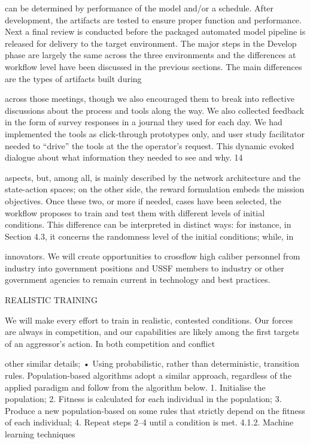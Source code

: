 \documentclass[a4paper,12pt]{article}
\begin{document}
can be determined by performance of the model and/or a schedule.
After development, the artifacts are tested to ensure proper function and performance. Next a ﬁnal review is conducted
before the packaged automated model pipeline is released for delivery to the target environment.
The major steps in the Develop phase are largely the same across the three environments and the diﬀerences at
workﬂow level have been discussed in the previous sections. The main diﬀerences are the types of artifacts built during

across those meetings, though we also encouraged them to
break into reﬂective discussions about the process and tools
along the way. We also collected feedback in the form of
survey responses in a journal they used for each day. We
had implemented the tools as click-through prototypes only,
and user study facilitator needed to “drive” the tools at the the
operator’s request. This dynamic evoked dialogue about what
information they needed to see and why.
14

aspects, but, among all, is mainly described by the network architecture and
the state-action spaces; on the other side, the reward formulation embeds the
mission objectives. Once these two, or more if needed, cases have been selected,
the workflow proposes to train and test them with different levels of initial
conditions. This difference can be interpreted in distinct ways: for instance, in
Section 4.3, it concerns the randomness level of the initial conditions; while, in

innovators. We will create opportunities to crossflow 
high caliber personnel from industry into government 
positions and USSF members to industry or other 
government agencies to remain current in technology 
and best practices.  
 
REALISTIC TRAINING 
 
We will make every effort to train in realistic, contested 
conditions. Our forces are always in competition, and our 
capabilities are likely among the first targets of an 
aggressor’s action. In both competition and conflict

other similar details;  
• Using probabilistic, rather than deterministic, transition rules. 
Population-based algorithms adopt a similar approach, regardless of 
the applied paradigm and follow from the algorithm below.  
1. Initialise the population;  
2. Fitness is calculated for each individual in the population;  
3. Produce a new population-based on some rules that strictly depend 
on the fitness of each individual;  
4. Repeat steps 2–4 until a condition is met. 
4.1.2. Machine learning techniques
\end{document}
